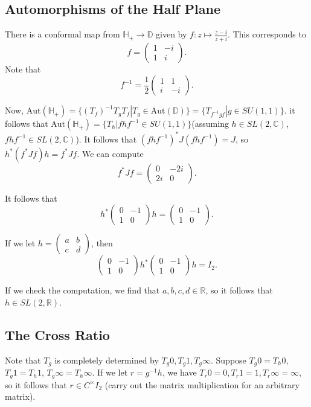\documentclass[12pt]{scrartcl}
\newcommand{\R}{\mathbb{R}}
\newcommand{\C}{\mathbb C}
\begin{document}
\subsection{Automorphisms of the Half Plane}
There is a conformal map from $\mathbb H_+ \to \mathbb D$ given by $f: z \mapsto \frac{z-i}{z+i}$.  This corresponds to $$f = \begin{pmatrix}
1 & -i \\
1 & i
\end{pmatrix}.$$  Note that $$f^{-1} = \frac{1}{2}\begin{pmatrix}
1 & 1 \\
i & -i
\end{pmatrix}.$$

Now, $\text{Aut}(\mathbb H_+) = \{(T_f)^{-1} T_g T_f | T_g \in \text{Aut}(\mathbb D)\} = \{T_{f^{-1}g f} | g \in SU(1, 1)\}$.  it follows that $\text{Aut}(\mathbb H_+) = \{T_h | f h f^{-1} \in SU(1, 1)\}$(assuming $h \in SL(2, \C)$, $fhf^{-1} \in SL(2, \C)$).  It follows that $(fhf^{-1})^* J (fhf^{-1}) = J$, so $h^* (f^* J f) h = f^* J f$.  We can compute $$f^* J f =  \begin{pmatrix}
0 & -2i \\
2i & 0  
\end{pmatrix}.$$ 

It follows that 
$$h^* \begin{pmatrix}
0 & -1 \\
1 & 0  
\end{pmatrix}h = \begin{pmatrix}
0 & -1 \\
1 & 0  
\end{pmatrix}.$$

If we let $h = \begin{pmatrix}
a & b \\
c & d 
\end{pmatrix}$,
then 
$$\begin{pmatrix}
0 & -1 \\
1 & 0  
\end{pmatrix} h^* \begin{pmatrix}
0 & -1 \\
1 & 0  
\end{pmatrix} h = I_2.$$

If we check the computation, we find that $a, b, c, d \in \R$, so it follows that $h \in SL(2, \R)$. 

\subsection{The Cross Ratio}
Note that $T_g$ is completely determined by $T_g 0, T_g 1, T_g \infty$.   Suppose $T_g 0 = T_h 0$, $T_g 1 =T_h 1$, $T_g\infty = T_h \infty$.  If we let $r = g^{-1} h$, we have $T_r 0 = 0, T_r 1 = 1, T_r \infty = \infty$, so it follows that $r \in C^\times I_2$ (carry out the matrix multiplication for an arbitrary matrix).
\end{document}
